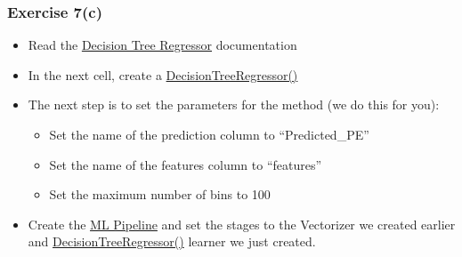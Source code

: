\documentclass[11pt]{article}
\providecommand{\tightlist}{%
      \setlength{\itemsep}{0pt}\setlength{\parskip}{0pt}}
\begin{document}
\hypertarget{exercise-7c}{%
\subsubsection{Exercise 7(c)}\label{exercise-7c}}

\begin{itemize}
\item
  Read the
  \href{https://spark.apache.org/docs/latest/api/python/reference/api/pyspark.ml.regression.DecisionTreeRegressor.html?highlight=decisiontreeregression}{Decision
  Tree Regressor} documentation
\item
  In the next cell, create a
  \href{https://spark.apache.org/docs/latest/api/python/reference/api/pyspark.ml.regression.DecisionTreeRegressor.html?highlight=decisiontreeregression}{DecisionTreeRegressor()}
\item
  The next step is to set the parameters for the method (we do this for
  you):

  \begin{itemize}
  \tightlist
  \item
    Set the name of the prediction column to ``Predicted\_PE''
  \item
    Set the name of the features column to ``features''
  \item
    Set the maximum number of bins to 100
  \end{itemize}
\item
  Create the
  \href{https://spark.apache.org/docs/latest/api/python/reference/api/pyspark.ml.Pipeline.html}{ML
  Pipeline} and set the stages to the Vectorizer we created earlier and
  \href{https://spark.apache.org/docs/latest/api/python/reference/api/pyspark.ml.regression.DecisionTreeRegressor.html?highlight=decisiontreeregression}{DecisionTreeRegressor()}
  learner we just created.
\end{itemize}
\end{document}
